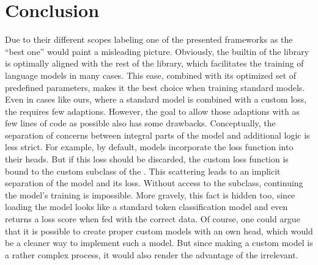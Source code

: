 \documentclass[letterpaper,10pt,english]{jupyterBook}
\begin{document}
\chapter{Conclusion}
\label{\detokenize{Conclusion:conclusion}}\label{\detokenize{Conclusion::doc}}
\sphinxAtStartPar
Due to their different scopes labeling one of the presented frameworks as the “best one” would paint a misleading picture.
Obviously, the built\sphinxhyphen{}in  of the  library is optimally aligned with the rest of the library, which facilitates the training of language models in many cases.
This ease, combined with its optimized set of predefined parameters, makes it the best choice when training standard models.
Even in cases like ours, where a standard model is combined with a custom loss, the  requires few adaptions.
However, the goal to allow those adaptions with as few lines of code as possible also has some drawbacks. Conceptually, the separation of concerns between integral parts of the model and additional logic is less strict.
For example, by default,  models incorporate the loss function into their heads. But if this loss should be discarded, the custom loss function is bound to the custom subclass of the . This scattering leads to an implicit separation of the model and its loss.
Without access to the  subclass, continuing the model’s training is impossible. More gravely, this fact is hidden too, since loading the model looks like a standard token classification model and even returns a loss score when fed with the correct data.
Of course, one could argue that it is possible to create proper custom models with an own head, which would be a cleaner way to implement such a model. But since making a custom model is a rather complex process, it would also render the advantage of the  irrelevant.
\end{document}

